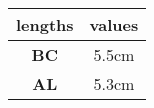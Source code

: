 \begin{tabular}{|c|c|}
\hline
\textbf{lengths} & \textbf{values}\\
\hline
\textbf{BC} & 5.5cm\\
\hline
\textbf{AL} & 5.3cm\\
\hline
\end{tabular}
